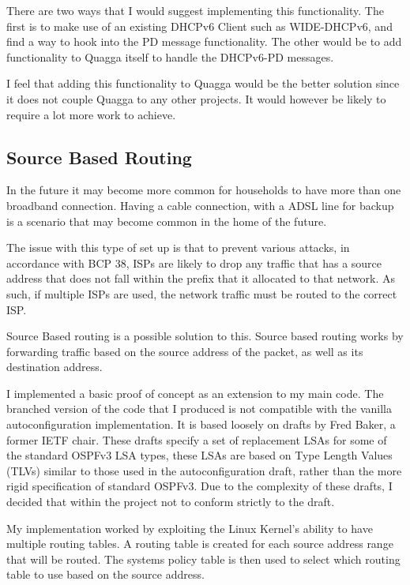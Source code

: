 \documentclass[12pt]{report}
\begin{document}
There are two ways that I would suggest implementing this functionality. The
first is to make use of an existing DHCPv6 Client such as WIDE-DHCPv6, and find
a way to hook into the PD message functionality. The other would be to add
functionality to Quagga itself to handle the DHCPv6-PD messages. 

I feel that adding this functionality to Quagga would be the better solution
since it does not couple Quagga to any other projects. It would however be
likely to require a lot more work to achieve.

\subsection{Source Based Routing}
In the future it may become more common for households to have more than one
broadband connection. Having a cable connection, with a ADSL line for backup is
a scenario that may become common in the home of the future. 

The issue with this type of set up is that to prevent various attacks, in
accordance with BCP 38, ISPs are likely to drop any traffic that has a source
address that does not fall within the prefix that it allocated to that network.
As such, if multiple ISPs are used, the network traffic must be routed to the
correct ISP. 

Source Based routing is a possible solution to this. Source based routing works
by forwarding traffic based on the source address of the packet, as well as its
destination address. 

I implemented a basic proof of concept as an extension to my main code. The
branched version of the code that I produced is not compatible with the vanilla
autoconfiguration implementation. It is based loosely on drafts by Fred Baker,
a former IETF chair. These drafts specify a set of replacement LSAs for some of
the standard OSPFv3 LSA types, these LSAs are based on Type Length Values
(TLVs) similar to those used in the autoconfiguration draft, rather than the
more rigid specification of standard OSPFv3. Due to the complexity of these
drafts, I decided that within the project not to conform strictly to the
draft.

My implementation worked by exploiting the Linux Kernel's ability to have
multiple routing tables. A routing table is created for each source address
range that will be routed. The systems policy table is then used to select
which routing table to use based on the source address.  
\end{document}
